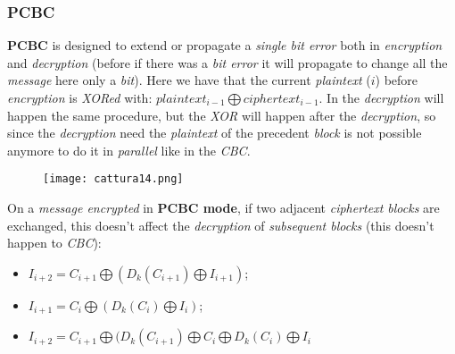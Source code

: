 \documentclass{article}
\begin{document}
\subsubsection{PCBC}
\textbf{PCBC} is designed to extend or propagate a \emph{single bit error }both in \emph{encryption} and \emph{decryption} (before if there was a \emph{bit error} it will propagate to change all the \emph{message} here only a \emph{bit}). Here we have that the current \emph{plaintext} ($i$) before \emph{encryption} is \emph{XORed} with: $plaintext_{i-1} \bigoplus ciphertext_{i-1}$. In the \emph{decryption} will happen the same procedure, but the \emph{XOR} will happen after the \emph{decryption}, so since the \emph{decryption} need the \emph{plaintext} of the precedent \emph{block} is not possible anymore to do it in \emph{parallel} like in the \emph{CBC}. 
\begin{figure}[H]
  \centering
  \texttt{[image: cattura14.png]}
\end{figure}
On a \emph{message encrypted} in \textbf{PCBC mode}, if two adjacent \emph{ciphertext blocks} are exchanged, this doesn't affect the \emph{decryption} of \emph{subsequent blocks} (this doesn't happen to \emph{CBC}):
\begin{itemize}
\item $I_{i+2} = C_{i+1} \bigoplus (D_k (C_{i+1}) \bigoplus I_{i+1}) $;
\item $I_{i+1} = C_{i} \bigoplus (D_k (C_{i}) \bigoplus I_{i}) $;
\item $I_{i+2} = C_{i+1} \bigoplus (D_k (C_{i+1}) \bigoplus C_{i} \bigoplus D_k(C_i) \bigoplus I_i$
\end{itemize}
\end{document}
